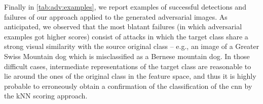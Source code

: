 Finally in \ref{tab:adv:examples}, we report examples of successful detections and failures of our approach applied to the generated adversarial images. %
As anticipated, we observed that the most blatant failures (in which adversarial examples got higher scores) consist of attacks in which the target class share a strong visual similarity with the source original class -- e.g., an image of a Greater Swiss Mountain dog which is misclassified as a Bernese mountain dog.
In those difficult cases, intermediate representations of the target class are reasonable to lie around the ones of the original class in the feature space, and thus it is highly probable to erroneously obtain a confirmation of the classification of the \gls{cnn} by the kNN scoring approach.

